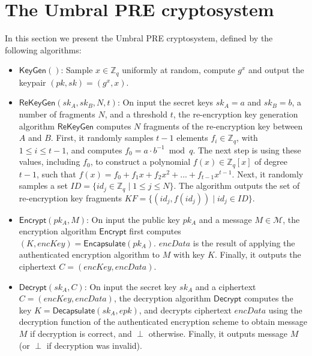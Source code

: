 \documentclass[12pt]{article}
\begin{document}
\section{The Umbral PRE cryptosystem}

In this section we present the Umbral PRE cryptosystem, defined by the following algorithms:

\begin{itemize}
	\item $\mathsf{KeyGen}()$: Sample $x \in \mathbb Z_q$ uniformly at random, compute $g^x$ and output the keypair $(pk, sk) = (g^x, x)$.

	\item $\mathsf{ReKeyGen}(sk_A, sk_B, N, t)$: On input the secret keys $sk_{A} = a$ and $sk_{B} = b$, a number of fragments $N$, and a threshold $t$, the re-encryption key generation algorithm $\mathsf{ReKeyGen}$ computes $N$ fragments of the re-encryption key between $A$ and $B$. 
	First, it randomly samples $t-1$ elements $f_i\in \mathbb Z_q$, with $1 \leq i \leq t-1$, and  computes $f_0 = a \cdot b^{-1} \bmod q$. The next step is using these values, including $f_0$, to construct a polynomial $f(x) \in \mathbb Z_q[x]$ of degree $t-1$, such that $f(x) = f_0 + f_1x + f_2x^2 + ... + f_{t-1}x^{t-1}$.  Next, it randomly samples a set $ID = \{ id_j \in \mathbb Z_q\mid 1 \leq j \leq N\}$. The algorithm outputs the set of re-encryption key fragments $KF = \{ ( id_j, f(id_j)) \mid id_j \in ID\}$.

	\item $\mathsf{Encrypt}(pk_A, M)$: On input the public key $pk_A$ and a message $M\in\mathcal{M}$, the encryption algorithm $\mathsf{Encrypt}$ first computes $(K, encKey) = \mathsf{Encapsulate}(pk_A)$.  
	$encData$ is the result of applying the authenticated encryption algorithm to $M$ with key $K$. 
	Finally, it outputs the ciphertext $C = (encKey, encData)$.
	
		\item $\mathsf{Decrypt}(sk_A, C)$: On input the secret key $sk_A$ and a ciphertext $C = (encKey, encData)$, the decryption algorithm $\mathsf{Decrypt}$ %
		computes the key $K = \mathsf{Decapsulate}(sk_A, epk)$, and decrypts ciphertext $encData$ using the decryption function of the authenticated encryption scheme to obtain message $M$ if decryption is correct, and $\perp$ otherwise. Finally, it outputs message $M$ (or $\perp$ if decryption was invalid).


\end{itemize}
\end{document}
